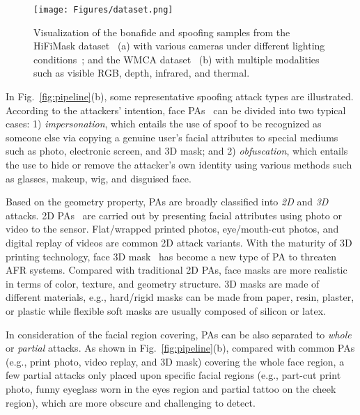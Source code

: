 \documentclass[10pt,journal,compsoc]{IEEEtran}
\begin{document}
\begin{figure}
\centering
\texttt{[image: Figures/dataset.png]}
  \caption{ 
  Visualization of the bonafide and spoofing samples from the HiFiMask dataset~\cite{liu2021contrastive} (a) with various cameras under different lighting conditions~\cite{liu2021contrastive}; and the WMCA dataset~\cite{george2019biometric} (b) with multiple modalities such as visible RGB, depth, infrared, and thermal.
  }
\label{fig:dataset}
\end{figure}



In Fig.~\ref{fig:pipeline}(b), some representative spoofing attack types are illustrated. According to the attackers' intention, face PAs~\cite{marcel2019handbook} can be divided into two typical cases: 1)  \textit{impersonation}, which entails the use of spoof to be recognized as someone else via copying a genuine user’s facial attributes to special mediums such as photo, electronic screen, and 3D mask; and 2) \textit{obfuscation}, which entails
the use to hide or remove the attacker’s own identity using various methods such as glasses, makeup, wig, and disguised face.

Based on the geometry property, PAs are broadly classified into \textit{2D} and \textit{3D} attacks. 2D PAs~\cite{ramachandra2017presentation} are carried out by presenting facial attributes using photo or video to the sensor. Flat/wrapped printed photos, eye/mouth-cut photos, and digital replay of videos are common 2D attack variants. With the maturity of 3D printing technology, face 3D mask~\cite{jia2020survey} has become a new type of PA to threaten AFR systems. Compared with traditional 2D PAs, face masks are more realistic in terms of color, texture, and
geometry structure. 3D masks are made of different materials, e.g., hard/rigid masks can be made from paper, resin, plaster, or plastic while flexible soft masks are usually composed of silicon or latex. 

In consideration of the facial region covering, PAs can be also separated to \textit{whole} or \textit{partial} attacks. As shown in Fig.~\ref{fig:pipeline}(b), compared with common PAs (e.g., print photo, video replay, and 3D mask) covering the whole face region, a few partial attacks only placed upon specific facial regions (e.g., part-cut print photo, funny eyeglass worn in the eyes region and partial tattoo on the cheek region), which are more obscure and challenging to detect.
\end{document}
